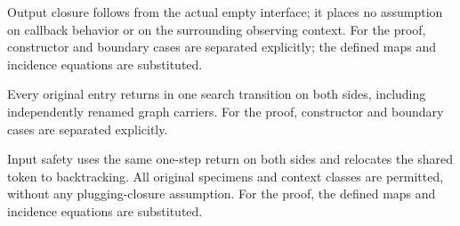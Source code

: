 Output closure follows from the actual empty interface; it places no assumption on callback behavior or on the surrounding observing context.
For the proof, constructor and boundary cases are separated explicitly; the defined maps and incidence equations are substituted.
\par{}

Every original entry returns in one search transition on both sides, including independently renamed graph carriers.
For the proof, constructor and boundary cases are separated explicitly.
\par{}

Input safety uses the same one-step return on both sides and relocates the shared token to backtracking. All original specimens and context classes are permitted, without any plugging-closure assumption.
For the proof, the defined maps and incidence equations are substituted.
\par{}

